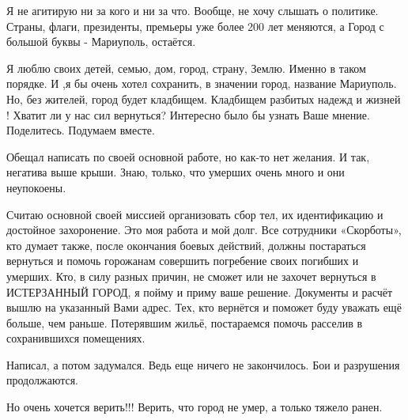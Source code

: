 Я не агитирую ни за кого и ни за что. Вообще, не хочу  слышать о политике.
Страны, флаги, президенты, премьеры уже более 200 лет меняются, а Город с
большой буквы - Мариуполь, остаётся.

Я люблю своих детей, семью, дом, город, страну, Землю. Именно в таком порядке. И
,я бы очень хотел сохранить, в значении город, название Мариуполь.  Но, без
жителей, город будет кладбищем. Кладбищем разбитых надежд и жизней ! Хватит ли
у нас сил вернуться? Интересно было бы узнать Ваше мнение. Поделитесь. Подумаем
вместе.

Обещал написать по своей основной работе, но как-то нет желания. И так, негатива
выше крыши. Знаю, только, что умерших очень много и они неупокоены.

Считаю основной своей миссией организовать сбор тел, их идентификацию и
достойное захоронение. Это моя работа и мой долг. Все сотрудники «Скорботы»,
кто думает также, после окончания боевых действий, должны постараться
вернуться и помочь горожанам совершить погребение своих погибших и умерших.
Кто, в силу разных причин, не сможет или не захочет вернуться в ИСТЕРЗАННЫЙ
ГОРОД, я пойму и приму ваше решение. Документы и расчёт вышлю на указанный
Вами адрес. Тех, кто вернётся и поможет буду уважать ещё больше, чем раньше.
Потерявшим жильё, постараемся помочь расселив в сохранившихся помещениях.

Написал, а потом задумался. Ведь еще ничего не закончилось. Бои и разрушения
продолжаются.

Но очень хочется верить!!! Верить, что город не умер, а только тяжело ранен.
